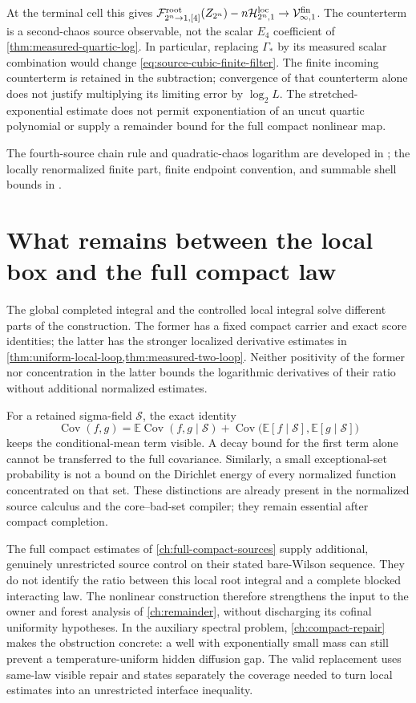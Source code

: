 \documentclass[11pt,oneside,openany]{book}
\theoremstyle{definition}
\theoremstyle{remark}
\newcommand{\E}{\mathbb E}
\newcommand{\Cov}{\operatorname{Cov}}
\newcommand{\src}[2]{\cite[#2]{#1}}
\newcommand{\sourcebasis}[1]{\par\smallskip\noindent #1\par}
\begin{document}
At the terminal cell this gives
$\mathcal F^{\rm root}_{2^n\to1,[4]}(Z_{2^n})
 -n\mathcal H^{\rm loc}_{2^n,1}\to\mathcal V^{\rm fin}_{\infty,1}$.
The counterterm is a second-chaos source observable, not the scalar
$E_4$ coefficient of \cref{thm:measured-quartic-log}. In particular,
replacing $\Gamma_*$ by its measured scalar combination would change
\cref{eq:source-cubic-finite-filter}. The finite incoming counterterm
is retained in the subtraction; convergence of that counterterm alone
does not justify multiplying its limiting error by $\log_2L$.
The stretched-exponential estimate does not permit exponentiation of an
uncut quartic polynomial or supply a remainder bound for the full compact
nonlinear map.
\sourcebasis{The fourth-source chain rule and quadratic-chaos logarithm
are developed in \src{F14}{V31}; the locally renormalized finite part,
finite endpoint convention, and summable shell bounds in
\src{F14}{V32}.}


\section{What remains between the local box and the full compact law}
\label{sec:compact-local-interface}
The global completed integral and the controlled local integral solve
different parts of the construction. The former has a fixed compact
carrier and exact score identities; the latter has the stronger
localized derivative estimates in
\cref{thm:uniform-local-loop,thm:measured-two-loop}.
Neither positivity of the former nor concentration in the latter
bounds the logarithmic derivatives of their ratio without additional
normalized estimates.

For a retained sigma-field $\mathscr S$, the exact identity
\begin{equation}\label{eq:conditional-means-retained}
 \Cov(f,g)=\E\Cov(f,g\mid\mathscr S)
          +\Cov\bigl(\E[f\mid\mathscr S],\E[g\mid\mathscr S]\bigr)
\end{equation}
keeps the conditional-mean term visible. A decay bound for the first
term alone cannot be transferred to the full covariance. Similarly,
a small exceptional-set probability is not a bound on the Dirichlet
energy of every normalized function concentrated on that set.
These distinctions are already present in the normalized source
calculus and the core--bad-set compiler; they remain essential after
compact completion. \src{F12}{V19, V23--V26, V33}

The full compact estimates of \cref{ch:full-compact-sources} supply
additional, genuinely unrestricted source control on their stated
bare-Wilson sequence. They do not identify the ratio between this
local root integral and a complete blocked interacting law.
The nonlinear construction therefore strengthens the input to the
owner and forest analysis of \cref{ch:remainder}, without discharging
its cofinal uniformity hypotheses. In the auxiliary spectral problem,
\cref{ch:compact-repair} makes the obstruction concrete: a well with
exponentially small mass can still prevent a temperature-uniform
hidden diffusion gap. The valid replacement uses same-law visible
repair and states separately the coverage needed to turn local
estimates into an unrestricted interface inequality.
\end{document}
